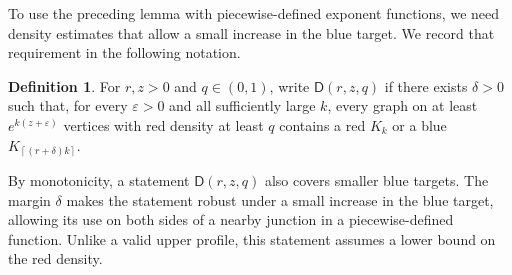 \documentclass[11pt]{article}
\theoremstyle{definition}
\newtheorem{definition}[theorem]{Definition}
\theoremstyle{remark}
\newcommand{\D}{\mathsf D}
\newcommand{\ceil}[1]{\left\lceil #1\right\rceil}
\numberwithin{equation}{section}
\begin{document}
To use the preceding lemma with piecewise-defined exponent functions,
we need density estimates that allow a small increase in the blue target.
We record that requirement in the following notation.

\begin{definition}\label{def:density}
For $r,z>0$ and $q\in(0,1)$, write $\D(r,z,q)$ if there exists $\delta>0$ such that, for every $\varepsilon>0$ and all sufficiently large $k$, every graph on at least $e^{k(z+\varepsilon)}$ vertices with red density at least $q$ contains a red $K_k$ or a blue $K_{\ceil{(r+\delta)k}}$.
\end{definition}

By monotonicity, a statement $\D(r,z,q)$ also covers smaller blue
targets. The margin $\delta$ makes the statement robust under a small
increase in the blue target, allowing its use on both sides of a nearby
junction in a piecewise-defined function. Unlike a valid upper profile,
this statement assumes a lower bound on the red density.
\end{document}

